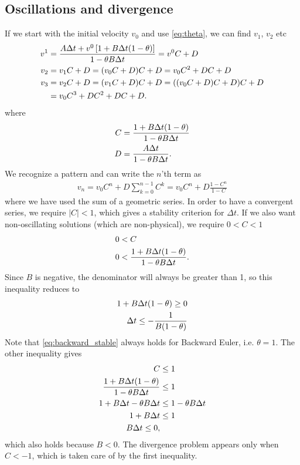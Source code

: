 \documentclass[a4paper,10pt]{article}
\renewcommand{\(}{\left(}
\renewcommand{\)}{\right)}
\begin{document}
\subsection{Oscillations and divergence}
If we start with the initial velocity $v_0$ and use \eqref{eq:theta}, we can find $v_1$, $v_2$ etc
\begin{align*}
  v^1 &= {A\Delta t + v^0\left[1 + B\Delta t(1-\theta) \right] \over 1 - \theta B\Delta t} = v^0C + D\\
  v_2 &= v_1C + D = (v_0C + D)C + D = v_0C^2 + DC + D\\
  v_3 &= v_2C + D = (v_1C + D)C + D = ((v_0C + D)C + D)C + D\\
      &= v_0C^3 + DC^2 + DC + D.
\end{align*}
where
\begin{align*}
  C&={1 + B\Delta t(1-\theta)\over 1 - \theta B\Delta t}\\  
  D&={A\Delta t \over 1 - \theta B\Delta t}.
\end{align*}
We recognize a pattern and can write the $n$'th term as
\begin{align*}
  v_n = v_0 C^n + D\sum_{k=0}^{n-1}C^k = v_0C^n + D\frac{1 - C^n}{1 - C}
\end{align*}
where we have used the sum of a geometric series. In order to have a convergent series, we require $|C|<1$, which gives a stability criterion for $\Delta t$. If we also want non-oscillating solutions (which are non-physical), we require $0 < C < 1$
\begin{align*}
  0 &< C\\
  0 &< {1 + B\Delta t(1-\theta)\over 1 - \theta B\Delta t}.
\end{align*}
Since $B$ is negative, the denominator will always be greater than 1, so this inequality reduces to
\begin{align}
  \label{eq:backward_stable}
  1 + B\Delta t(1-\theta) \geq 0\\
  \nonumber
  \Delta t \leq -{1 \over B(1-\theta)}
\end{align}
Note that \eqref{eq:backward_stable} always holds for Backward Euler, i.e. $\theta = 1$. The other inequality gives
\begin{align*}
  C &\leq 1\\
  {1 + B\Delta t(1-\theta)\over 1 - \theta B\Delta t} &\leq 1\\
  1 + B\Delta t - \theta B\Delta t &\leq 1 - \theta B\Delta t\\
  1 + B\Delta t&\leq 1\\
  B\Delta t \leq 0,
\end{align*}
which also holds because $B<0$. The divergence problem appears only when $C < -1$, which is taken care of by the first inequality.
\end{document}
